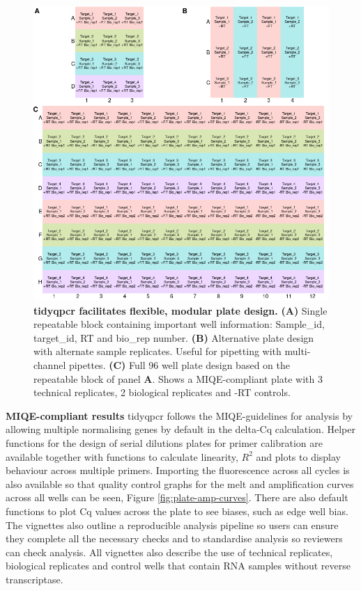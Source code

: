 \documentclass{SBCbookchapter}
\begin{document}
\begin{figure}[H]

{\centering \includegraphics[width=1\linewidth]{figures/combined_plate_plans.png} 

}

\caption{\textbf{tidyqpcr facilitates flexible, modular plate design.} \textbf{(A)} Single repeatable block containing important well information: Sample\_id, target\_id, RT and bio\_rep number. \textbf{(B)} Alternative plate design with alternate sample replicates. Useful for pipetting with multi-channel pipettes. \textbf{(C)} Full 96 well plate design based on the repeatable block of panel \textbf{A}. Shows a MIQE-compliant plate with 3 technical replicates, 2 biological replicates and -RT controls.} \label{fig:combined-plate-design}
\end{figure}


\textbf{MIQE-compliant results} tidyqpcr follows the MIQE-guidelines for analysis by allowing multiple normalising genes by default in the delta-Cq calculation. 
Helper functions for the design of serial dilutions plates for primer calibration are available together with functions to calculate linearity, $R^2$ and plots to display behaviour across multiple primers.
Importing the fluorescence across all cycles is also available so that quality control graphs for the melt and amplification curves across all wells can be seen, Figure \ref{fig:plate-amp-curves}.
There are also default functions to plot Cq values across the plate to see biases, such as edge well bias. 
The vignettes also outline a reproducible analysis pipeline so users can ensure they complete all the necessary checks and to standardise analysis so reviewers can check analysis.
All vignettes also describe the use of technical replicates, biological replicates and control wells that contain RNA samples without reverse transcriptase.
\end{document}
